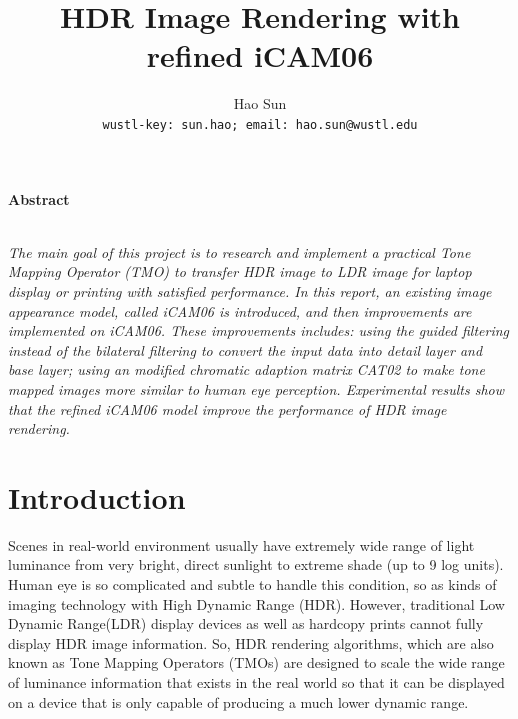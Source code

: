 \documentclass[10pt,twocolumn,letterpaper]{article}
\date{}
\title{HDR Image Rendering with refined iCAM06}
\author{%
Hao Sun\\
{\tt wustl-key: sun.hao; email: hao.sun@wustl.edu}
}
\begin{document}
\maketitle


\begin{center}\textbf{Abstract}\\~\\\parbox{0.475\textwidth}{\em
     The main goal of this project is to research and implement a practical Tone Mapping Operator (TMO) to transfer HDR image to LDR image for laptop display or printing with satisfied performance. In this report, an existing image appearance model, called iCAM06 is introduced, and then improvements are implemented on iCAM06. These improvements includes: using the guided filtering instead of the bilateral filtering to convert the input data into detail layer and base layer; using an modified chromatic adaption matrix CAT02 to make tone mapped images more similar to human eye perception. Experimental results show that the refined iCAM06 model improve the performance of HDR image rendering.

}\end{center}

\section{Introduction}
Scenes in real-world environment usually have extremely wide range of light luminance from very bright, direct sunlight to extreme shade (up to 9 log units). Human eye is so complicated and subtle to handle this condition, so as kinds of imaging technology with High Dynamic Range (HDR). However, traditional Low Dynamic Range(LDR) display devices as well as hardcopy prints cannot fully display HDR image information. So, HDR rendering algorithms, which are also known as Tone Mapping Operators (TMOs) are designed to scale the wide range of luminance information that exists in the real world so that it can be displayed on a device that is only capable of producing a much lower dynamic range\cite{kuang2007icam06}.
\end{document}
